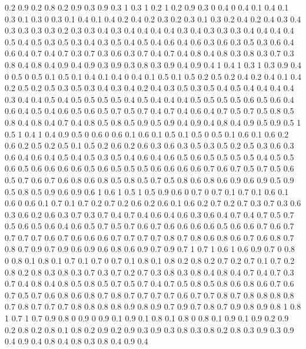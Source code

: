 0.2 0.9
0.2 0.8
0.2 0.9
0.3 0.9
0.3 1
0.3 1
0.2 1
0.2 0.9
0.3 0
0.4 0
0.4 0.1
0.4 0.1
0.3 0.1
0.3 0
0.3 0.1
0.4 0.1
0.4 0.2
0.4 0.2
0.3 0.2
0.3 0.1
0.3 0.2
0.4 0.2
0.4 0.3
0.4 0.3
0.3 0.3
0.3 0.2
0.3 0.3
0.4 0.3
0.4 0.4
0.4 0.4
0.3 0.4
0.3 0.3
0.3 0.4
0.4 0.4
0.4 0.5
0.4 0.5
0.3 0.5
0.3 0.4
0.3 0.5
0.4 0.5
0.4 0.6
0.4 0.6
0.3 0.6
0.3 0.5
0.3 0.6
0.4 0.6
0.4 0.7
0.4 0.7
0.3 0.7
0.3 0.6
0.3 0.7
0.4 0.7
0.4 0.8
0.4 0.8
0.3 0.8
0.3 0.7
0.3 0.8
0.4 0.8
0.4 0.9
0.4 0.9
0.3 0.9
0.3 0.8
0.3 0.9
0.4 0.9
0.4 1
0.4 1
0.3 1
0.3 0.9
0.4 0
0.5 0
0.5 0.1
0.5 0.1
0.4 0.1
0.4 0
0.4 0.1
0.5 0.1
0.5 0.2
0.5 0.2
0.4 0.2
0.4 0.1
0.4 0.2
0.5 0.2
0.5 0.3
0.5 0.3
0.4 0.3
0.4 0.2
0.4 0.3
0.5 0.3
0.5 0.4
0.5 0.4
0.4 0.4
0.4 0.3
0.4 0.4
0.5 0.4
0.5 0.5
0.5 0.5
0.4 0.5
0.4 0.4
0.4 0.5
0.5 0.5
0.5 0.6
0.5 0.6
0.4 0.6
0.4 0.5
0.4 0.6
0.5 0.6
0.5 0.7
0.5 0.7
0.4 0.7
0.4 0.6
0.4 0.7
0.5 0.7
0.5 0.8
0.5 0.8
0.4 0.8
0.4 0.7
0.4 0.8
0.5 0.8
0.5 0.9
0.5 0.9
0.4 0.9
0.4 0.8
0.4 0.9
0.5 0.9
0.5 1
0.5 1
0.4 1
0.4 0.9
0.5 0
0.6 0
0.6 0.1
0.6 0.1
0.5 0.1
0.5 0
0.5 0.1
0.6 0.1
0.6 0.2
0.6 0.2
0.5 0.2
0.5 0.1
0.5 0.2
0.6 0.2
0.6 0.3
0.6 0.3
0.5 0.3
0.5 0.2
0.5 0.3
0.6 0.3
0.6 0.4
0.6 0.4
0.5 0.4
0.5 0.3
0.5 0.4
0.6 0.4
0.6 0.5
0.6 0.5
0.5 0.5
0.5 0.4
0.5 0.5
0.6 0.5
0.6 0.6
0.6 0.6
0.5 0.6
0.5 0.5
0.5 0.6
0.6 0.6
0.6 0.7
0.6 0.7
0.5 0.7
0.5 0.6
0.5 0.7
0.6 0.7
0.6 0.8
0.6 0.8
0.5 0.8
0.5 0.7
0.5 0.8
0.6 0.8
0.6 0.9
0.6 0.9
0.5 0.9
0.5 0.8
0.5 0.9
0.6 0.9
0.6 1
0.6 1
0.5 1
0.5 0.9
0.6 0
0.7 0
0.7 0.1
0.7 0.1
0.6 0.1
0.6 0
0.6 0.1
0.7 0.1
0.7 0.2
0.7 0.2
0.6 0.2
0.6 0.1
0.6 0.2
0.7 0.2
0.7 0.3
0.7 0.3
0.6 0.3
0.6 0.2
0.6 0.3
0.7 0.3
0.7 0.4
0.7 0.4
0.6 0.4
0.6 0.3
0.6 0.4
0.7 0.4
0.7 0.5
0.7 0.5
0.6 0.5
0.6 0.4
0.6 0.5
0.7 0.5
0.7 0.6
0.7 0.6
0.6 0.6
0.6 0.5
0.6 0.6
0.7 0.6
0.7 0.7
0.7 0.7
0.6 0.7
0.6 0.6
0.6 0.7
0.7 0.7
0.7 0.8
0.7 0.8
0.6 0.8
0.6 0.7
0.6 0.8
0.7 0.8
0.7 0.9
0.7 0.9
0.6 0.9
0.6 0.8
0.6 0.9
0.7 0.9
0.7 1
0.7 1
0.6 1
0.6 0.9
0.7 0
0.8 0
0.8 0.1
0.8 0.1
0.7 0.1
0.7 0
0.7 0.1
0.8 0.1
0.8 0.2
0.8 0.2
0.7 0.2
0.7 0.1
0.7 0.2
0.8 0.2
0.8 0.3
0.8 0.3
0.7 0.3
0.7 0.2
0.7 0.3
0.8 0.3
0.8 0.4
0.8 0.4
0.7 0.4
0.7 0.3
0.7 0.4
0.8 0.4
0.8 0.5
0.8 0.5
0.7 0.5
0.7 0.4
0.7 0.5
0.8 0.5
0.8 0.6
0.8 0.6
0.7 0.6
0.7 0.5
0.7 0.6
0.8 0.6
0.8 0.7
0.8 0.7
0.7 0.7
0.7 0.6
0.7 0.7
0.8 0.7
0.8 0.8
0.8 0.8
0.7 0.8
0.7 0.7
0.7 0.8
0.8 0.8
0.8 0.9
0.8 0.9
0.7 0.9
0.7 0.8
0.7 0.9
0.8 0.9
0.8 1
0.8 1
0.7 1
0.7 0.9
0.8 0
0.9 0
0.9 0.1
0.9 0.1
0.8 0.1
0.8 0
0.8 0.1
0.9 0.1
0.9 0.2
0.9 0.2
0.8 0.2
0.8 0.1
0.8 0.2
0.9 0.2
0.9 0.3
0.9 0.3
0.8 0.3
0.8 0.2
0.8 0.3
0.9 0.3
0.9 0.4
0.9 0.4
0.8 0.4
0.8 0.3
0.8 0.4
0.9 0.4
